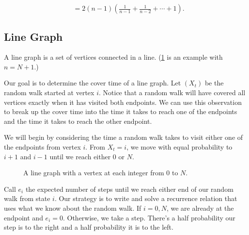 \documentclass[12pt]{article}
\theoremstyle{definition}
\DeclareMathOperator{\tcov}{t_\textrm{cov}}      %
\begin{document}
\begin{align}
\tcov&= 2(n-1) \left(\frac{1}{n-1}+\frac{1}{n-2}+\cdots+1\right). \nonumber
\end{align}

\subsection{Line Graph}\label{sec:line_graph}
A line graph is a set of vertices connected in a line.
(\cref{fig:line} is an example with $n=N+1$.)

Our goal is to determine the cover time of a line graph.
Let $(X_t)$ be the random walk started at vertex $i$.
Notice that a random walk will have covered all vertices
exactly when it has visited both endpoints.
We can use this observation to break up the cover time into the time it takes
to reach one of the endpoints and the time it takes to reach 
the other endpoint.

We will begin by considering the time a random walk takes to
visit either one of the endpoints from vertex $i$.
From $X_t=i$, we move with equal probability to $i+1$
and $i-1$ until we reach either $0$ or $N$.

\begin{figure}[ht]
	\centering
	\caption{A   line graph with a vertex at each integer from $0$ to $N$.}\label{fig:line}
\end{figure}

Call $e_i$ the expected number of steps until we reach either
end of our random walk from state $i$.
Our strategy is to write and solve a recurrence relation that
uses what we know about the random walk.
If $i=0,N$, we are already at the endpoint and $e_i=0$.
Otherwise, we take a step.
There's a half probability our step is to the right and
a half probability it is to the left.
\end{document}
